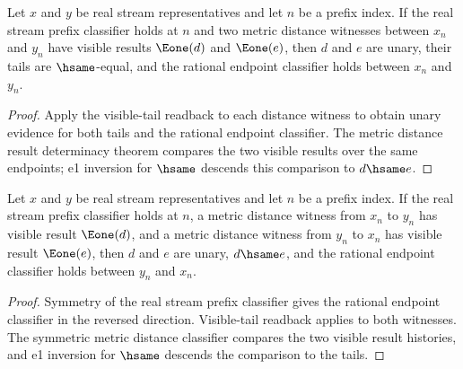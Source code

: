 \begin{theorem}
\label{thm:completion-metric-distance-witness-e1-result-tail-deterministic}
Let $x$ and $y$ be real stream representatives and let $n$ be a prefix index. If the
real stream prefix classifier holds at $n$ and two metric distance witnesses between
$x_n$ and $y_n$ have visible results $\Eone(d)$ and $\Eone(e)$, then $d$ and $e$ are
unary, their tails are $\hsame$-equal, and the rational endpoint classifier holds
between $x_n$ and $y_n$.
\end{theorem}
\begin{proof}
Apply the visible-tail readback to each distance witness to obtain unary evidence
for both tails and the rational endpoint classifier. The metric distance result
determinacy theorem compares the two visible results over the same endpoints; e1
inversion for $\hsame$ descends this comparison to $d\hsame e$.
\end{proof}

\begin{theorem}
\label{thm:completion-metric-distance-witness-e1-symmetric-tail-real-prefix-readback}
Let $x$ and $y$ be real stream representatives and let $n$ be a prefix index. If the
real stream prefix classifier holds at $n$, a metric distance witness from $x_n$ to
$y_n$ has visible result $\Eone(d)$, and a metric distance witness from $y_n$ to
$x_n$ has visible result $\Eone(e)$, then $d$ and $e$ are unary, $d\hsame e$, and the
rational endpoint classifier holds between $y_n$ and $x_n$.
\end{theorem}
\begin{proof}
Symmetry of the real stream prefix classifier gives the rational endpoint classifier
in the reversed direction. Visible-tail readback applies to both witnesses. The
symmetric metric distance classifier compares the two visible result histories, and
e1 inversion for $\hsame$ descends the comparison to the tails.
\end{proof}

